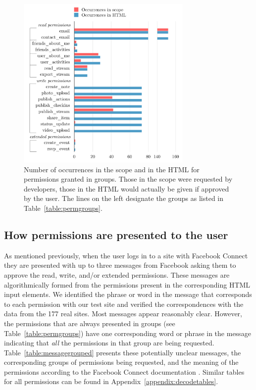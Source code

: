 \documentclass[10pt]{sig-alternate-10pt}
\begin{document}
\begin{figure}[h!]
  \centering
  \includegraphics[width=8.5cm]{scope_vs_html_cosn}
  \caption{Number of occurrences in the scope and in the HTML for permissions granted in groups. Those in the scope were requested by developers, those in the HTML would actually be given if approved by the user. The lines on the left designate the groups as listed in Table~\ref{table:permgroups}.}
  \label{figure:scopevshtml}
\end{figure}


\subsection{How permissions are presented to the user} 
\label{sec:messages} 

As mentioned previously, when the user logs in to a site with Facebook Connect they are presented with up to three messages from Facebook asking them to approve the read, write, and/or extended permissions. These messages are algorithmically formed from the permissions present in the corresponding HTML input elements. We identified the phrase or word in the message that corresponds to each permission with our test site and verified the correspondences with the data from the 177 real sites. Most messages appear reasonably clear. However, the permissions that are always presented in groups (see Table~\ref{table:permgroups}) have one corresponding word or phrase in the message indicating that \emph{all} the permissions in that group are being requested. Table~\ref{table:messagegrouped} presents these potentially unclear messages, the corresponding groups of permissions being requested, and the meaning of the permissions according to the Facebook Connect documentation \cite{fbpermissions}. Similar tables for all permissions can be found in Appendix~\ref{appendix:decodetables}.
\end{document}

